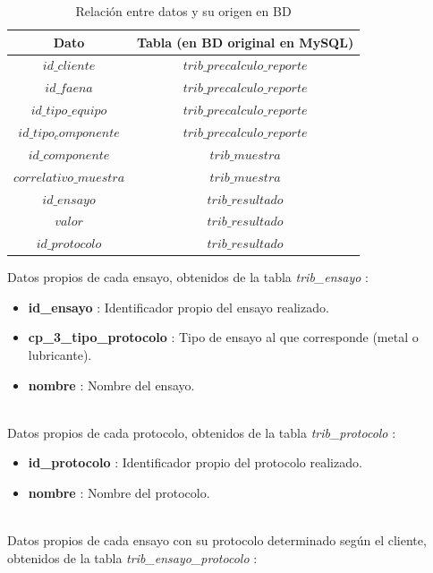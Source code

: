 \documentclass{article}
\begin{document}
\begin{table}[!htbp]\centering
\begin{tabular}{|c|c|}
\hline 
Dato & Tabla (en BD original en MySQL) \\ 
\hline 
$id\_cliente$ & $trib\_precalculo\_reporte$ \\ 
\hline 
$id\_faena$ & $trib\_precalculo\_reporte$ \\ 
\hline 
$id\_tipo\_equipo$ & $trib\_precalculo\_reporte$ \\ 
\hline 
$id\_tipo_componente$ & $trib\_precalculo\_reporte$ \\ 
\hline 
$id\_componente$ & $trib\_muestra$ \\ 
\hline 
$correlativo\_muestra$ & $trib\_muestra$ \\ 
\hline 
$id\_ensayo$ & $trib\_resultado$ \\ 
\hline 
$valor$ & $trib\_resultado$ \\ 
\hline 
$id\_protocolo$ & $trib\_resultado$ \\ 
\hline 
\end{tabular} 
\caption{Relación entre datos y su origen en BD}
\end{table}

Datos propios de cada ensayo, obtenidos de la tabla \textit{trib\_ensayo} :

\begin{itemize}
	\item \textbf{id\_ensayo} : Identificador propio del ensayo realizado.
	\item \textbf{cp\_3\_tipo\_protocolo} : Tipo de ensayo al que corresponde (metal o lubricante).
	\item \textbf{nombre} : Nombre del ensayo.
\end{itemize}
~\\
Datos propios de cada protocolo, obtenidos de la tabla \textit{trib\_protocolo} :

\begin{itemize}
	\item \textbf{id\_protocolo} : Identificador propio del protocolo realizado.
	\item \textbf{nombre} : Nombre del protocolo.
\end{itemize}
~\\
Datos propios de cada ensayo con su protocolo determinado según el cliente, obtenidos de la tabla \textit{trib\_ensayo\_protocolo} :
\end{document}
